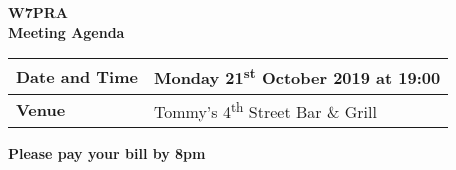\documentclass[letter,11pt]{extarticle}
\begin{document}
	\thispagestyle{empty}
	
	\begin{center}
		\textbf{W7PRA\\Meeting Agenda}
		\vspace{0.33cm}
	\end{center}
	
	\begin{center}
		\begin{tabular}{| m{3.0cm} | m{7.5cm} |} \hline
			\textbf{Date and Time} & Monday 21\textsuperscript{st} October 2019 at 19:00 \\ \hline
			\textbf{Venue} & Tommy's 4\textsuperscript{th} Street Bar \& Grill \\ \hline
				\end{tabular}
	\end{center}
	
	\begin{center}
		\textbf{Please pay your bill by 8pm}
	\end{center}
	
\end{document}
